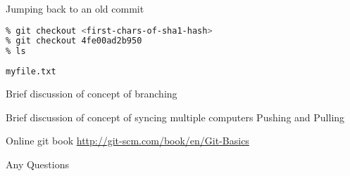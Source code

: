 \documentclass{beamer}
\begin{document}
\begin{frame}[fragile]
\begin{block}{Jumping back to an old commit}
\begin{lstlisting}[language=bash,basicstyle=\ttfamily\scriptsize,breaklines=true]
% git log
% git checkout <first-chars-of-sha1-hash>
% git checkout 4fe00ad2b950
% ls
\end{lstlisting}

\begin{lstlisting}[language=bash,basicstyle=\sl\ttfamily\scriptsize]
myfile.txt
\end{lstlisting}
\end{block}
\end{frame}












 
\begin{frame}
\begin{block}{Brief discussion of concept of branching}
\end{block}
\end{frame}


\begin{frame}
\begin{block}{Brief discussion of concept of syncing multiple computers}
Pushing and Pulling
\end{block}
\end{frame}


\begin{frame}
\begin{block}{Online git book}
\url{http://git-scm.com/book/en/Git-Basics}
\end{block}
\end{frame}

\begin{frame}
\begin{block}{Any Questions}
\end{block}
\end{frame}
\end{document}
